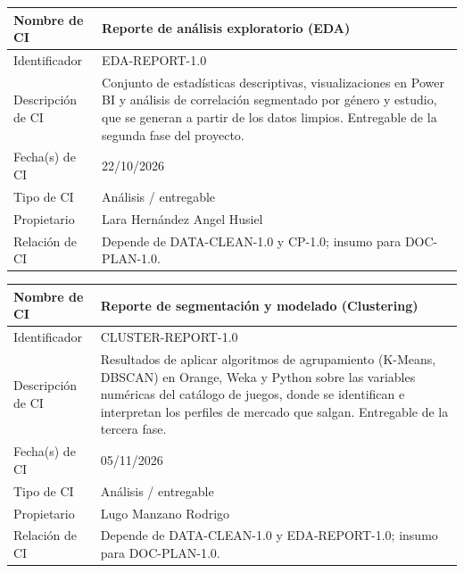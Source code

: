 \documentclass[letterpaper,11pt]{article}
\begin{document}
\noindent\begin{minipage}{\textwidth}
\small\renewcommand{\arraystretch}{1.9}
\begin{tabularx}{\textwidth}{|p{3.3cm}|Y|}
\hline
Nombre de CI & Reporte de análisis exploratorio (EDA) \\ \hline
Identificador & EDA-REPORT-1.0 \\ \hline
Descripción de CI & Conjunto de estadísticas descriptivas, visualizaciones en Power BI y análisis de correlación segmentado por género y estudio, que se generan a partir de los datos limpios. Entregable de la segunda fase del proyecto. \\ \hline
Fecha(s) de CI & 22/10/2026 \\ \hline
Tipo de CI & Análisis / entregable \\ \hline
Propietario & Lara Hernández Angel Husiel \\ \hline
Relación de CI & Depende de DATA-CLEAN-1.0 y CP-1.0; insumo para DOC-PLAN-1.0. \\ \hline
\end{tabularx}
\end{minipage}\par\bigskip
\noindent\begin{minipage}{\textwidth}
\small\renewcommand{\arraystretch}{1.9}
\begin{tabularx}{\textwidth}{|p{3.3cm}|Y|}
\hline
Nombre de CI & Reporte de segmentación y modelado (Clustering) \\ \hline
Identificador & CLUSTER-REPORT-1.0 \\ \hline
Descripción de CI & Resultados de aplicar algoritmos de agrupamiento (K-Means, DBSCAN) en Orange, Weka y Python sobre las variables numéricas del catálogo de juegos, donde se identifican e interpretan los perfiles de mercado que salgan. Entregable de la tercera fase. \\ \hline
Fecha(s) de CI & 05/11/2026 \\ \hline
Tipo de CI & Análisis / entregable \\ \hline
Propietario & Lugo Manzano Rodrigo \\ \hline
Relación de CI & Depende de DATA-CLEAN-1.0 y EDA-REPORT-1.0; insumo para DOC-PLAN-1.0. \\ \hline
\end{tabularx}
\end{minipage}\par\bigskip
\end{document}
